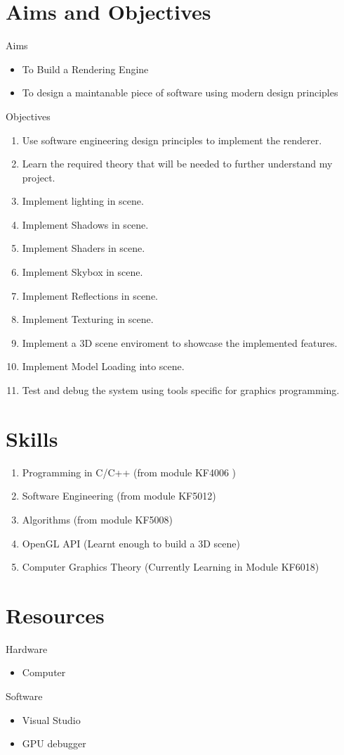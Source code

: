 \section{Aims and Objectives}
Aims
\begin{itemize}
  \item To Build a Rendering Engine
  \item To design a maintanable piece of software using modern design principles
\end{itemize}

Objectives
\begin{enumerate}
  \item Use software engineering design principles to implement the renderer.
  \item Learn the required theory that will be needed to further understand my project.
  \item Implement lighting in scene.
  \item Implement Shadows in scene.
  \item Implement Shaders in scene.
  \item Implement Skybox in scene.
  \item Implement Reflections in scene.
  \item Implement Texturing in scene.
  \item Implement a 3D scene enviroment to showcase the implemented features.
  \item Implement Model Loading into scene.
  \item Test and debug the system using tools specific for graphics programming.  
\end{enumerate}
\section{Skills}
\begin{enumerate}
	\item Programming in C/C++ (from module KF4006 )
	\item Software Engineering (from module KF5012)
	\item Algorithms (from module KF5008) 
	\item OpenGL API (Learnt enough to build a 3D scene) 
	\item Computer Graphics Theory (Currently Learning in Module KF6018)
\end{enumerate}

\section{Resources}
Hardware
\begin{itemize}
  \item Computer
  
\end{itemize}
Software
\begin{itemize}
  \item Visual Studio
  \item GPU debugger
\end{itemize}

